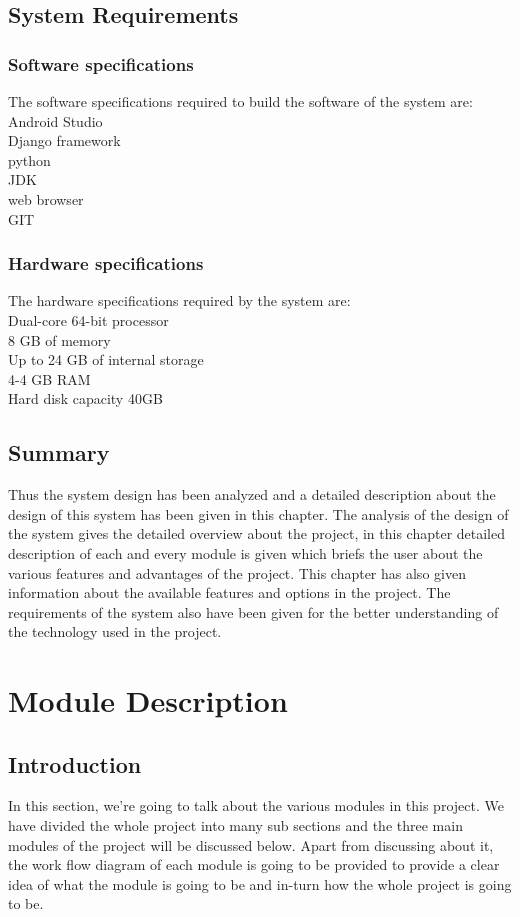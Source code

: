 \documentclass[BTech]{srmuthesis}
\begin{document}
\section{System Requirements}
\subsection{Software specifications}
The software specifications required to build the software of the system are:\\
Android Studio\\
Django framework\\
python\\
JDK\\
web browser\\
GIT 
\subsection{Hardware specifications}
The hardware specifications required by the system are:\\
Dual-core 64-bit processor\\
8 GB of memory\\
Up to 24 GB of internal storage\\
4-4 GB RAM\\
Hard disk capacity 40GB
\section{Summary}
Thus the system design has been analyzed and a detailed description about the design of this system has been given in this chapter. The analysis of the design of the system gives the detailed overview about the project, in this chapter detailed description of each and every module is given which briefs the user about the various features and advantages of the project. This chapter has also given information about the available features and options in the project. The requirements of the system also have been given for the better understanding of the technology used in the project.

\chapter{Module Description}
\section{Introduction}
In this section, we're going to talk about the various modules in this project. We have divided the whole project into many sub sections and the three main modules of the project will be discussed below. Apart from discussing about it, the work flow diagram of each module is going to be provided to provide a clear idea of what the module is going to be and in-turn how the whole project is going to be.
\end{document}
